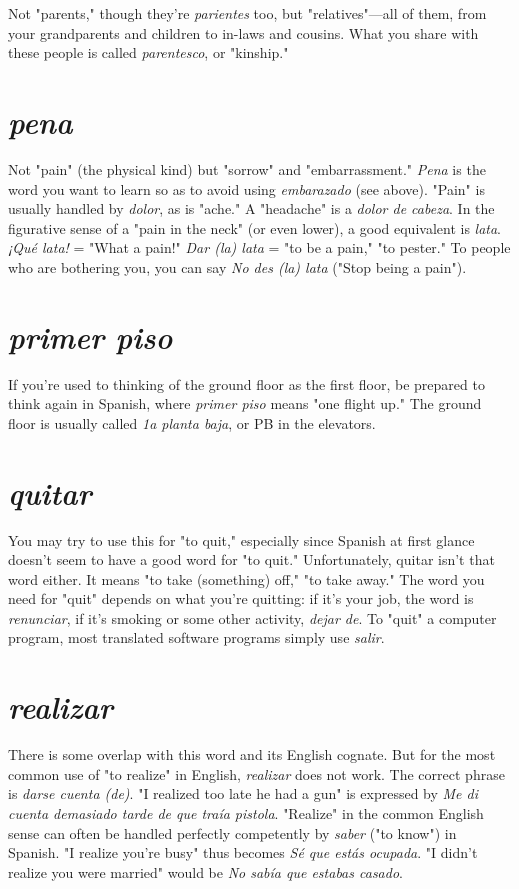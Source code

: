 \documentclass[14pt,a4paper,oneside]{memoir}
\begin{document}
Not "parents," though they're \emph{parientes} too, but
"relatives"---all of them, from your grandparents and children to in-laws and cousins. What you share with these people is called \emph{parentesco}, or "kinship."

\section{\emph{pena}}

Not "pain" (the physical kind) but "sorrow" and "embarrassment." \emph{Pena} is the word you want to learn so as to avoid using
\emph{embarazado} (see above). "Pain" is usually handled by \emph{dolor}, as is
"ache." A "headache" is a \emph{dolor de cabeza}. In the figurative sense of
a "pain in the neck" (or even lower), a good equivalent is \emph{lata}. \emph{¡Qué
lata!} = "What a pain!" \emph{Dar (la) lata} = "to be a pain," "to pester." To
people who are bothering you, you can say \emph{No des (la) lata} ("Stop being a pain").

\section{\emph{primer piso}}

If you're used to thinking of the ground floor as
the first floor, be prepared to think again in Spanish, where \emph{primer piso}
means "one flight up." The ground floor is usually called \emph{1a planta
baja}, or PB in the elevators.

\section{\emph{quitar}}

You may try to use this for "to quit," especially
since Spanish at first glance doesn't seem to have a good word for "to
quit." Unfortunately, quitar isn't that word either. It means "to take
(something) off," "to take away." The word you need for "quit" depends on what you're quitting: if it's your job, the word is \emph{renunciar}, if
it's smoking or some other activity, \emph{dejar de}. To "quit" a computer
program, most translated software programs simply use \emph{salir}.

\section{\emph{realizar}}

There is some overlap with this word and its English cognate. But for the most common use of "to realize" in English,
\emph{realizar} does not work. The correct phrase is \emph{darse cuenta (de)}. "I realized too late he had a gun" is expressed by \emph{Me di cuenta demasiado
tarde de que traía pistola}. "Realize" in the common English sense can
often be handled perfectly competently by \emph{saber} ("to know") in Spanish. "I realize you're busy" thus becomes \emph{Sé que estás ocupada}. "I
didn't realize you were married" would be \emph{No sabía que estabas
casado}.
\end{document}
